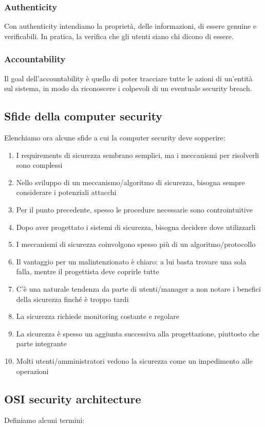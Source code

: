 \documentclass[11pt]{article}
\begin{document}
\subsubsection{Authenticity}
Con authenticity intendiamo la proprietà, delle informazioni, di essere genuine e verificabili. In pratica, la verifica che gli utenti siano chi dicono di essere.

\subsubsection{Accountability}
Il goal dell'accountability è quello di poter tracciare tutte le azioni di un'entità sul sistema, in modo da riconoscere i colpevoli di un eventuale security breach. 

\subsection{Sfide della computer security}
Elenchiamo ora alcune sfide a cui la computer security deve sopperire:
\begin{enumerate}
    \item I requirements di sicurezza sembrano semplici, ma i meccanismi per risolverli sono complessi
    \item Nello sviluppo di un meccanismo/algoritmo di sicurezza, bisogna sempre considerare i potenziali attacchi
    \item Per il punto precedente, spesso le procedure necessarie sono controintuitive
    \item Dopo aver progettato i sistemi di sicurezza, bisogna decidere dove utilizzarli
    \item I meccanismi di sicurezza coinvolgono spesso più di un algoritmo/protocollo
    \item Il vantaggio per un malintenzionato è chiaro: a lui basta trovare una sola falla, mentre il progettista deve coprirle tutte
    \item C'è una naturale tendenza da parte di utenti/manager a non notare i benefici della sicurezza finché è troppo tardi 
    \item La sicurezza richiede monitoring costante e regolare
    \item La sicurezza è spesso un aggiunta successiva alla progettazione, piuttosto che parte integrante
    \item Molti utenti/amministratori vedono la sicurezza come un impedimento alle operazioni
\end{enumerate}
\subsection{OSI security architecture}
Definiamo alcuni termini:
\end{document}
